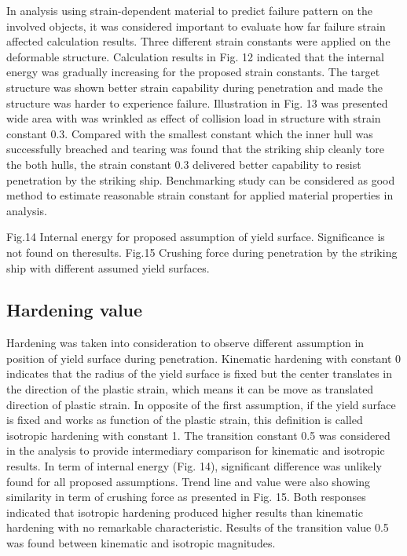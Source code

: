 \documentclass[10pt,journal]{IEEEtran}
\begin{document}
In analysis using strain-dependent material to predict failure pattern on the involved objects, it was considered important to evaluate how far failure strain affected calculation results. 
Three different strain constants were applied on the deformable structure. 
Calculation results in Fig. 12 indicated that the internal energy was gradually increasing for the proposed strain constants. 
The target structure was shown better strain capability during penetration and made the structure was harder to experience failure. Illustration in Fig. 13 was presented wide area with was wrinkled as effect 
of collision load in structure with strain constant 0.3. Compared with the smallest constant which the inner hull was successfully breached and tearing was found that the striking ship cleanly tore the both hulls, 
the strain constant 0.3 delivered better capability to resist penetration by the striking ship. 
Benchmarking study can be considered as good method to estimate reasonable strain constant for applied material properties in analysis. 

Fig.14 Internal energy for proposed assumption of yield surface. Significance is not found on theresults. 
Fig.15 Crushing force during penetration by the striking ship with different assumed yield surfaces.

\subsection{Hardening value}

Hardening was taken into consideration to observe different assumption in position of yield surface during penetration. 
Kinematic hardening with constant 0 indicates that the radius of the yield surface is fixed but the center translates in the direction of the plastic strain, which means it can be move as translated direction of plastic strain. 
In opposite of the first assumption, if the yield surface is fixed and works as function of the plastic strain, this definition is called isotropic hardening with constant 1. 
The transition constant 0.5 was considered in the analysis to provide intermediary comparison for kinematic and isotropic results. 
In term of internal energy (Fig. 14), significant difference was unlikely found for all proposed assumptions. Trend line and value were also showing similarity in term of crushing force as presented in Fig. 15. 
Both responses indicated that isotropic hardening produced higher results than kinematic hardening with no remarkable characteristic. Results of the transition value 0.5 was found between kinematic and isotropic magnitudes. 
\end{document}
